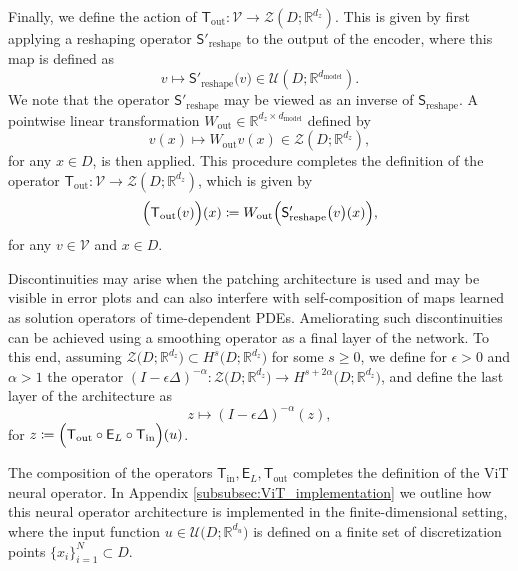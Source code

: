 \documentclass[twoside]{article}
\newcommand{\1}{\mathbbm{1}}
\newcommand{\R}{\mathbbm{R}}
\newcommand{\cU}{\mathcal{U}}
\newcommand{\cZ}{\mathcal{Z}}
\newcommand{\cV}{\mathcal{V}}
\newcommand{\sT}{\mathsf{T}}
\newcommand{\sE}{\mathsf{E}}
\newcommand{\sS}{\mathsf{S}}
\providecommand{\mathbbm}{\mathbb} %
\begin{document}
Finally, we define the action of $\sT_\textrm{out} : \cV \to \cZ(D; \R^{d_z})$. This is given by first applying a reshaping operator $\sS'_{\textrm{reshape}}$ to the output of the encoder, where this map is defined as
\begin{equation}
    \label{eq:unshape}
{v}\mapsto\sS'_{\textrm{reshape}}\bigl({v}\bigr)\in \cU(D;\mathbb{R}^{d_{\textrm{model}}}).
\end{equation}
We note that the operator $\sS'_{\textrm{reshape}}$ may be viewed as an inverse of $\sS_{\textrm{reshape}}$. A pointwise linear transformation $W_{\textrm{out}}\in \R^{d_z \times d_{\textrm{model}}}$ defined by
\begin{equation}
\label{eq:Wout_nl}
    v(x)\mapsto W_{\textrm{out}}{v}(x) \in \cZ(D;\R^{d_z}),
\end{equation}
for any $x\in D$, is then applied. This procedure completes the definition of the operator $\sT_\textrm{out} : \cV \to \cZ(D; \R^{d_z})$, which is given by 
\begin{equation}
\label{eq:T_out_patch}
    \Bigl(\sT_\textrm{out}(v)\Bigr)(x) \coloneqq W_{\textrm{out}} \Bigl(\sS'_{\textrm{reshape}}\bigl(v \bigr)(x)\Bigr),
\end{equation}
for any $v\in \cV$ and $x\in D$.

\begin{remark}
\label{rm:smoothing}
    Discontinuities may arise when the patching architecture is used and may be visible in error plots and can also interfere with self-composition of maps learned as solution operators of time-dependent PDEs. Ameliorating such discontinuities can be achieved using a smoothing operator as a final layer of the network.
    To this end, assuming $\cZ\bigl(D;\R^{d_z}\bigr) \subset H^{s}\bigl(D;\R^{d_z}\bigr)$ for some $s\geq 0$, we define for $\epsilon>0$ and $\alpha>1$ the operator $(I- \epsilon\Delta)^{-\alpha} :\cZ\bigl(D;\R^{d_z}\bigr)\to H^{s+2\alpha}\bigl(D;\R^{d_z}\bigr)$, and define the last layer of the architecture as
\begin{equation}
\label{eq:Wout_smooth}
{z} \mapsto (I- \epsilon\Delta)^{-\alpha} (z),
\end{equation}
for $z \coloneqq \Bigl(\sT_{\rm{out}}\circ \sE_L \circ \sT_{\rm{in}}\Bigr) (u)$.
\end{remark}

The composition of the operators $\sT_\textrm{in}, \sE_L, \sT_\textrm{out}$ completes the definition of the ViT neural operator. In Appendix \ref{subsubsec:ViT_implementation} we outline how this neural operator architecture is implemented in the finite-dimensional setting, where the input function $u\in \cU\bigl( D; \R^{d_u} \bigr)$ is defined on a finite set of discretization points $\{x_i\}_{i=1}^N\subset D$.
\end{document}
